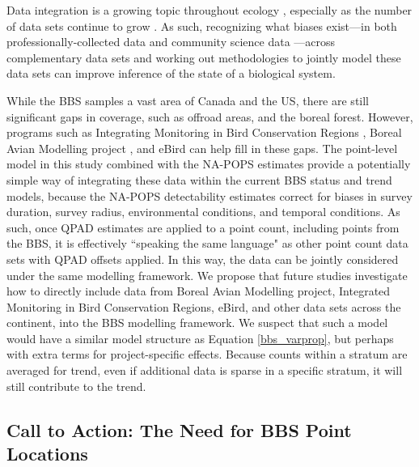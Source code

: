 \documentclass[12pt]{article}
\begin{document}
\par Data integration is a growing topic throughout ecology \citep{isaac_data_2020, miller_recent_2019, pacifici_integrating_2017, boersch-supan_integrating_2021}, especially as the number of data sets continue to grow \citep{binley_minimizing_2023}.
As such, recognizing what biases exist---in both professionally-collected data and community science data \citep{binley_data_2023}---across complementary data sets and working out methodologies to jointly model these data sets can improve inference of the state of a biological system.

\par While the BBS samples a vast area of Canada and the US, there are still significant gaps in coverage, such as offroad areas, and the boreal forest. 
However, programs such as Integrating Monitoring in Bird Conservation Regions \citep{pavlacky_statistically_2017}, Boreal Avian Modelling project \citep{cumming_toward_2010}, and eBird \citep{sullivan_ebird_2014} can help fill in these gaps.
The point-level model in this study combined with the NA-POPS estimates provide a potentially simple way of integrating these data within the current BBS status and trend models, because the NA-POPS detectability estimates correct for biases in survey duration, survey radius, environmental conditions, and temporal conditions.
As such, once QPAD \citep{solymos_calibrating_2013} estimates are applied to a point count, including points from the BBS, it is effectively ``speaking the same language" as other point count data sets with QPAD offsets applied.
In this way, the data can be jointly considered under the same modelling framework.
We propose that future studies investigate how to directly include data from Boreal Avian Modelling project, Integrated Monitoring in Bird Conservation Regions, eBird, and other data sets across the continent, into the BBS modelling framework.
We suspect that such a model would have a similar model structure as Equation \ref{bbs_varprop}, but perhaps with extra terms for project-specific effects.
Because counts within a stratum are averaged for trend, even if additional data is sparse in a specific stratum, it will still contribute to the trend.


\subsection{Call to Action: The Need for BBS Point Locations}
\end{document}
